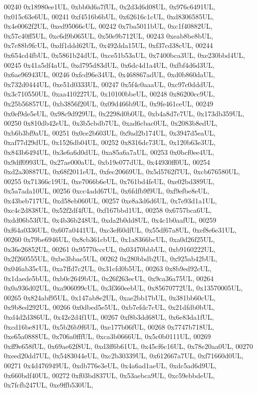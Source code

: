 \begin{DoxyCode}
00240     0x18980ee1UL, 0xbb0d6a7fUL, 0x2d3d6d08UL, 0x976c6491UL, 0x015c63e6UL,
00241     0xf4516b6bUL, 0x62616c1cUL, 0xd8306585UL, 0x4e0062f2UL, 0xed95066cUL,
00242     0x7ba5011bUL, 0xc1f40882UL, 0x57c40ff5UL, 0xc6d9b065UL, 0x50e9b712UL,
00243     0xeab8be8bUL, 0x7c88b9fcUL, 0xdf1ddd62UL, 0x492dda15UL, 0xf37cd38cUL,
00244     0x654cd4fbUL, 0x5861b24dUL, 0xce51b53aUL, 0x7400bca3UL, 0xe230bbd4UL,
00245     0x41a5df4aUL, 0xd795d83dUL, 0x6dc4d1a4UL, 0xfbf4d6d3UL, 0x6ae96943UL,
00246     0xfcd96e34UL, 0x468867adUL, 0xd0b860daUL, 0x732d0444UL, 0xe51d0333UL,
00247     0x5f4c0aaaUL, 0xc97c0dddUL, 0x3c710550UL, 0xaa410227UL, 0x10100bbeUL,
00248     0x86200cc9UL, 0x25b56857UL, 0xb3856f20UL, 0x09d466b9UL, 0x9fe461ceUL,
00249     0x0ef9de5eUL, 0x98c9d929UL, 0x2298d0b0UL, 0xb4a8d7c7UL, 0x173db359UL,
00250     0x810db42eUL, 0x3b5cbdb7UL, 0xad6cbac0UL, 0x2083b8edUL, 0xb6b3bf9aUL,
00251     0x0ce2b603UL, 0x9ad2b174UL, 0x3947d5eaUL, 0xaf77d29dUL, 0x1526db04UL,
00252     0x8316dc73UL, 0x120b63e3UL, 0x843b6494UL, 0x3e6a6d0dUL, 0xa85a6a7aUL,
00253     0x0bcf0ee4UL, 0x9dff0993UL, 0x27ae000aUL, 0xb19e077dUL, 0x44930ff0UL,
00254     0xd2a30887UL, 0x68f2011eUL, 0xfec20669UL, 0x5d5762f7UL, 0xcb676580UL,
00255     0x71366c19UL, 0xe7066b6eUL, 0x761bd4feUL, 0xe02bd389UL, 0x5a7ada10UL,
00256     0xcc4add67UL, 0x6fdfb9f9UL, 0xf9efbe8eUL, 0x43beb717UL, 0xd58eb060UL,
00257     0xe8a3d6d6UL, 0x7e93d1a1UL, 0xc4c2d838UL, 0x52f2df4fUL, 0xf167bbd1UL,
00258     0x6757bca6UL, 0xdd06b53fUL, 0x4b36b248UL, 0xda2b0dd8UL, 0x4c1b0aafUL,
00259     0xf64a0336UL, 0x607a0441UL, 0xc3ef60dfUL, 0x55df67a8UL, 0xef8e6e31UL,
00260     0x79be6946UL, 0x8cb361cbUL, 0x1a8366bcUL, 0xa0d26f25UL, 0x36e26852UL,
00261     0x95770cccUL, 0x03470bbbUL, 0xb9160222UL, 0x2f260555UL, 0xbe3bbac5UL,
00262     0x280bbdb2UL, 0x925ab42bUL, 0x046ab35cUL, 0xa7ffd7c2UL, 0x31cfd0b5UL,
00263     0x8b9ed92cUL, 0x1daede5bUL, 0xb0c2649bUL, 0x26f263ecUL, 0x9ca36a75UL,
00264     0x0a936d02UL, 0xa906099cUL, 0x3f360eebUL, 0x85670772UL, 0x13570005UL,
00265     0x824abf95UL, 0x147ab8e2UL, 0xae2bb17bUL, 0x381bb60cUL, 0x9b8ed292UL,
00266     0x0dbed5e5UL, 0xb7efdc7cUL, 0x21dfdb0bUL, 0xd4d2d386UL, 0x42e2d4f1UL,
00267     0xf8b3dd68UL, 0x6e83da1fUL, 0xcd16be81UL, 0x5b26b9f6UL, 0xe177b06fUL,
00268     0x7747b718UL, 0xe65a0888UL, 0x706a0fffUL, 0xca3b0666UL, 0x5c0b0111UL,
00269     0xff9e658fUL, 0x69ae62f8UL, 0xd3ff6b61UL, 0x45cf6c16UL, 0x78e20aa0UL,
00270     0xeed20dd7UL, 0x5483044eUL, 0xc2b30339UL, 0x612667a7UL, 0xf71660d0UL,
00271     0x4d476949UL, 0xdb776e3eUL, 0x4a6ad1aeUL, 0xdc5ad6d9UL, 0x660bdf40UL,
00272     0xf03bd837UL, 0x53aebca9UL, 0xc59ebbdeUL, 0x7fcfb247UL, 0xe9ffb530UL,

\end{DoxyCode}
